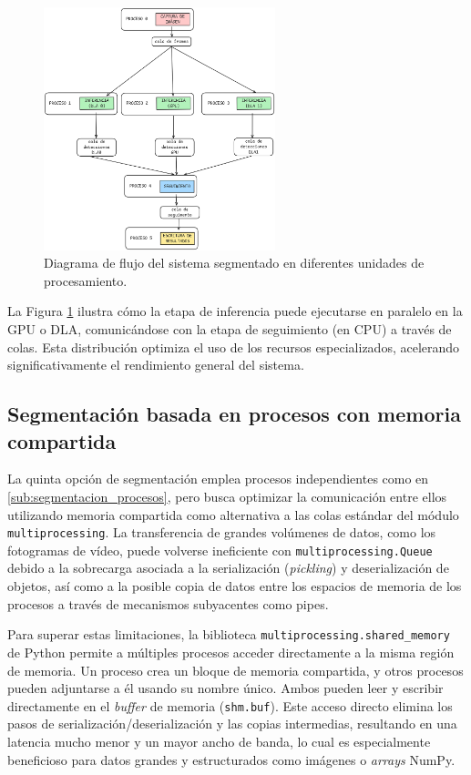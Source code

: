 \documentclass[11pt,spanish,listoffigures,listoftables]{tfgetsinf}
\begin{document}
\begin{figure}[H]
   \centering
   \includegraphics[width=0.6\textwidth]{images/diseno_e_implementacion/segmentacion_multihardware.png}
   \caption{Diagrama de flujo del sistema segmentado en diferentes unidades de procesamiento.}
   \label{fig:segmentacion_multihardware}
\end{figure}

La Figura \ref{fig:segmentacion_multihardware} ilustra cómo la etapa de inferencia puede ejecutarse en paralelo en la GPU o DLA, comunicándose con la etapa de seguimiento (en CPU) a través de colas. Esta distribución optimiza el uso de los recursos especializados, acelerando significativamente el rendimiento general del sistema.


\subsection{Segmentación basada en procesos con memoria compartida} \label{sub:segmentacion_memoria_compartida}


La quinta opción de segmentación emplea procesos independientes como en \ref{sub:segmentacion_procesos}, pero busca optimizar la comunicación entre ellos utilizando memoria compartida como alternativa a las colas estándar del módulo \texttt{multiprocessing}. La transferencia de grandes volúmenes de datos, como los fotogramas de vídeo, puede volverse ineficiente con \texttt{multiprocessing.Queue} debido a la sobrecarga asociada a la serialización (\textit{pickling}) y deserialización de objetos, así como a la posible copia de datos entre los espacios de memoria de los procesos a través de mecanismos subyacentes como pipes.

Para superar estas limitaciones, la biblioteca \texttt{multiprocessing.shared\_memory} de Python permite a múltiples procesos acceder directamente a la misma región de memoria. Un proceso crea un bloque de memoria compartida, y otros procesos pueden adjuntarse a él usando su nombre único. Ambos pueden leer y escribir directamente en el \textit{buffer} de memoria (\texttt{shm.buf}). Este acceso directo elimina los pasos de serialización/deserialización y las copias intermedias, resultando en una latencia mucho menor y un mayor ancho de banda, lo cual es especialmente beneficioso para datos grandes y estructurados como imágenes o \textit{arrays} NumPy.
\end{document}

